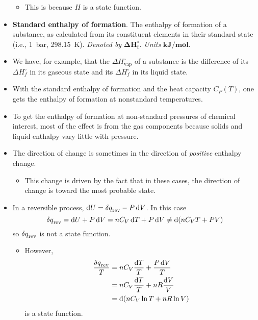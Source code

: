 \documentclass[../notes.tex]{subfiles}
\begin{document}
\begin{itemize}
\begin{itemize}
        \item This is because $H$ is a state function.
    \end{itemize}
    \item \textbf{Standard enthalpy of formation}. The enthalpy of formation of a substance, as calculated from its constituent elements in their standard state (i.e., \SI{1}{\bar}, \SI{298.15}{\kelvin}). \emph{Denoted by} $\bm{\Delta H_f^\circ}$. \emph{Units} $\textbf{kJ}\bm{/}\textbf{mol}$.
    \item We have, for example, that the $\Delta H_\text{vap}^\circ$ of a substance is the difference of its $\Delta H_f^\circ$ in its gaseous state and its $\Delta H_f^\circ$ in its liquid state.
    \item With the standard enthalpy of formation and the heat capacity $C_P(T)$, one gets the enthalpy of formation at nonstandard temperatures.
    \item To get the enthalpy of formation at non-standard pressures of chemical interest, most of the effect is from the gas components because solids and liquid enthalpy vary little with pressure.
    \item The direction of change is sometimes in the direction of \emph{positive} enthalpy change.
    \begin{itemize}
        \item This change is driven by the fact that in these cases, the direction of change is toward the most probable state.
    \end{itemize}
    \item In a reversible process, $\dd{U}=\var{q}_\text{rev}-P\dd{V}$. In this case
    \begin{equation*}
        \var{q}_\text{rev} = \dd{U}+P\dd{V} = nC_V\dd{T}+P\dd{V} \neq \dd{(nC_VT+PV)}
    \end{equation*}
    so $\var{q}_\text{rev}$ is not a state function.
    \begin{itemize}
        \item However,
        \begin{align*}
            \frac{\var{q}_\text{rev}}{T} &= nC_V\frac{\dd{T}}{T}+\frac{P\dd{V}}{T}\\
            &= nC_V\frac{\dd{T}}{T}+nR\frac{\dd{V}}{V}\\
            &= \dd{(nC_V\ln T+nR\ln V)}
        \end{align*}
        is a state function.
    \end{itemize}
\end{itemize}
\end{document}
